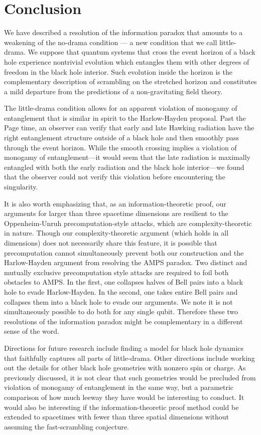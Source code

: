 \documentclass[a4paper,11pt]{article}
\theoremstyle{definition}
\begin{document}
\section{Conclusion}

We have described a resolution of the information paradox that amounts to a weakening of the no-drama condition --- a new condition that we call little-drama.
We suppose that quantum systems that cross the event horizon of a black hole experience nontrivial evolution which entangles them with other degrees of freedom in the black hole interior.
Such evolution inside the horizon is the complementary description of scrambling on the stretched horizon and constitutes a mild departure from the predictions of a non-gravitating field theory.

The little-drama condition allows for an apparent violation of monogamy of entanglement that is similar in spirit to the Harlow-Hayden proposal.
Past the Page time, an observer can verify that early and late Hawking radiation have the right entanglement structure outside of a black hole and then smoothly pass through the event horizon.
While the smooth crossing implies a violation of monogamy of entanglement---it would seem that the late radiation is maximally entangled with both the early radiation and the black hole interior---we found that the observer could not verify this violation before encountering the singularity.


It is also worth emphasizing that, as an information-theoretic proof, our arguments for larger than three spacetime dimensions are resilient to the Oppenheim-Unruh precomputation-style attacks, which are complexity-theoretic in nature. 
Though our complexity-theoretic argument (which holds in all dimensions) does not necessarily share this feature, it is possible that precomputation cannot simultaneously prevent both our construction and the Harlow-Hayden argument from resolving the AMPS paradox.
Two distinct and mutually exclusive precomputation style attacks are required to foil both obstacles to AMPS.
In the first, one collapses halves of Bell pairs into a black hole to evade Harlow-Hayden.
In the second, one takes entire Bell pairs and collapses them into a black hole to evade our arguments.
We note it is not simultaneously possible to do both for any single qubit.
Therefore these two resolutions of the information paradox might be complementary in a different sense of the word.

Directions for future research include finding a model for black hole dynamics that faithfully captures all parts of little-drama. Other directions include working out the details for other black hole geometries with nonzero spin or charge.
As previously discussed, it is not clear that such geometries would be precluded from violation of monogamy of entanglement in the same way, but a parametric comparison of how much leeway they have would be interesting to conduct.
It would also be interesting if the information-theoretic proof method could be extended to spacetimes with fewer than three spatial dimensions without assuming the fast-scrambling conjecture.
\end{document}
